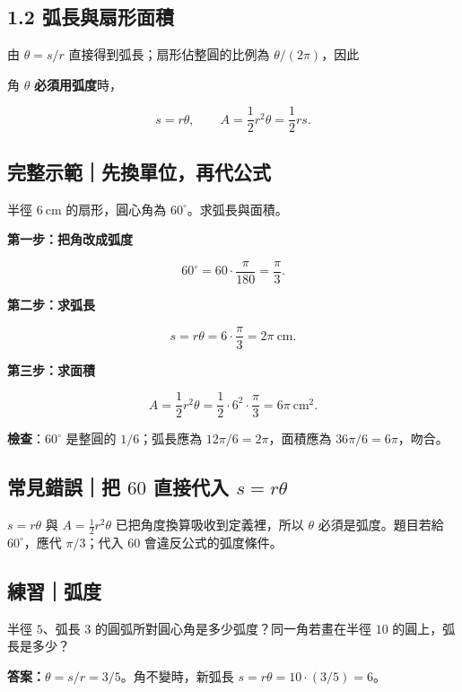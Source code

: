 \documentclass[11pt,a4paper]{article}
\begin{document}
\subsection{1.2 弧長與扇形面積}\label{ux5f27ux9577ux8207ux6247ux5f62ux9762ux7a4d}

由 \(\theta=s/r\) 直接得到弧長；扇形佔整圓的比例為 \(\theta/(2\pi)\)，因此

角 \(\theta\) \textbf{必須用弧度}時，

\[
\boxed{s=r\theta},
\qquad
\boxed{A=\frac12r^2\theta=\frac12rs}.
\]

\begin{HandoutWorkedExample}

\subsection{完整示範｜先換單位，再代公式}\label{ux5b8cux6574ux793aux7bc4ux5148ux63dbux55aeux4f4dux518dux4ee3ux516cux5f0f}

半徑 \(6\ \mathrm{cm}\) 的扇形，圓心角為 \(60^\circ\)。求弧長與面積。

\textbf{第一步：把角改成弧度}

\[
60^\circ=60\cdot\frac{\pi}{180}=\frac{\pi}{3}.
\]

\textbf{第二步：求弧長}

\[
s=r\theta=6\cdot\frac{\pi}{3}=2\pi\ \mathrm{cm}.
\]

\textbf{第三步：求面積}

\[
A=\frac12r^2\theta
=\frac12\cdot 6^2\cdot\frac{\pi}{3}
=6\pi\ \mathrm{cm^2}.
\]

\textbf{檢查}：\(60^\circ\) 是整圓的 \(1/6\)；弧長應為 \(12\pi/6=2\pi\)，面積應為 \(36\pi/6=6\pi\)，吻合。

\end{HandoutWorkedExample}

\subsection{\texorpdfstring{常見錯誤｜把 \(60\) 直接代入 \(s=r\theta\)}{常見錯誤｜把 60 直接代入 s=r\textbackslash theta}}\label{ux5e38ux898bux932fux8aa4ux628a-60-ux76f4ux63a5ux4ee3ux5165-srtheta}

\(s=r\theta\) 與 \(A=\tfrac12r^2\theta\) 已把角度換算吸收到定義裡，所以 \(\theta\) 必須是弧度。題目若給 \(60^\circ\)，應代 \(\pi/3\)；代入 \(60\) 會違反公式的弧度條件。

\begin{HandoutSelfCheck}

\subsection{練習｜弧度}\label{ux7df4ux7fd2ux5f27ux5ea6}

半徑 \(5\)、弧長 \(3\) 的圓弧所對圓心角是多少弧度？同一角若畫在半徑 \(10\) 的圓上，弧長是多少？

\textbf{答案：}\(\theta=s/r=3/5\)。角不變時，新弧長 \(s=r\theta=10\cdot(3/5)=6\)。

\end{HandoutSelfCheck}
\end{document}
